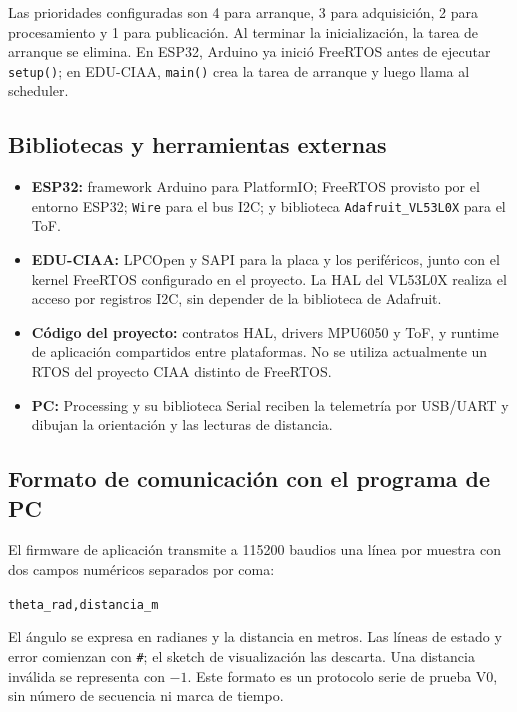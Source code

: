 Las prioridades configuradas son 4 para arranque, 3 para adquisición, 2 para
procesamiento y 1 para publicación. Al terminar la inicialización, la tarea de
arranque se elimina. En ESP32, Arduino ya inició FreeRTOS antes de ejecutar
\texttt{setup()}; en EDU-CIAA, \texttt{main()} crea la tarea de arranque y luego
llama al scheduler.

\subsection{Bibliotecas y herramientas externas}

\begin{itemize}
  \item \textbf{ESP32:} framework Arduino para PlatformIO; FreeRTOS provisto
        por el entorno ESP32; \texttt{Wire} para el bus I2C; y biblioteca
        \texttt{Adafruit\_VL53L0X} para el ToF.
  \item \textbf{EDU-CIAA:} LPCOpen y SAPI para la placa y los periféricos,
        junto con el kernel FreeRTOS configurado en el proyecto. La HAL del
        VL53L0X realiza el acceso por registros I2C, sin depender de la
        biblioteca de Adafruit.
  \item \textbf{Código del proyecto:} contratos HAL, drivers MPU6050 y ToF, y
        runtime de aplicación compartidos entre plataformas. No se utiliza
        actualmente un RTOS del proyecto CIAA distinto de FreeRTOS.
  \item \textbf{PC:} Processing y su biblioteca Serial reciben la telemetría
        por USB/UART y dibujan la orientación y las lecturas de distancia.
\end{itemize}

\subsection{Formato de comunicación con el programa de PC}

El firmware de aplicación transmite a 115200 baudios una línea por muestra con
dos campos numéricos separados por coma:

\begin{center}
\texttt{theta\_rad,distancia\_m}
\end{center}

El ángulo se expresa en radianes y la distancia en metros. Las líneas de estado
y error comienzan con \texttt{\#}; el sketch de visualización las descarta. Una
distancia inválida se representa con $-1$. Este formato es un protocolo serie
de prueba V0, sin número de secuencia ni marca de tiempo.


